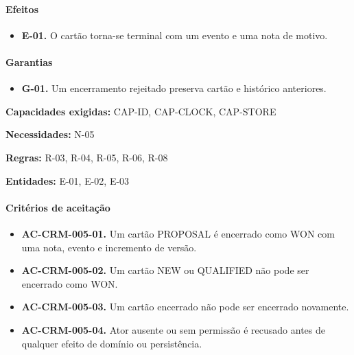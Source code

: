 \documentclass[10pt,a4paper]{article}
\begin{document}
\paragraph{Efeitos}

\begin{itemize}

\item \textbf{E-01.} O cartão torna-se terminal com um evento e uma nota de motivo.

\end{itemize}

\paragraph{Garantias}

\begin{itemize}

\item \textbf{G-01.} Um encerramento rejeitado preserva cartão e histórico anteriores.

\end{itemize}

\textbf{Capacidades exigidas:} CAP-ID, CAP-CLOCK, CAP-STORE

\textbf{Necessidades:} N-05

\textbf{Regras:} R-03, R-04, R-05, R-06, R-08

\textbf{Entidades:} E-01, E-02, E-03

\paragraph{Critérios de aceitação}

\begin{itemize}

\item \textbf{AC-CRM-005-01.} Um cartão PROPOSAL é encerrado como WON com uma nota, evento e incremento de versão.

\item \textbf{AC-CRM-005-02.} Um cartão NEW ou QUALIFIED não pode ser encerrado como WON.

\item \textbf{AC-CRM-005-03.} Um cartão encerrado não pode ser encerrado novamente.

\item \textbf{AC-CRM-005-04.} Ator ausente ou sem permissão é recusado antes de qualquer efeito de domínio ou persistência.

\end{itemize}
\end{document}
